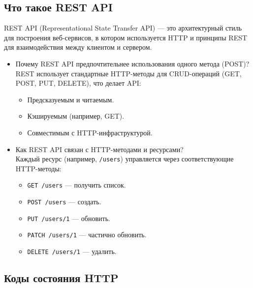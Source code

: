 \documentclass[a4paper,14pt]{article}
\begin{document}
\subsection{Что такое REST API}
REST API (Representational State Transfer API) — это архитектурный стиль для построения веб-сервисов, в котором используется HTTP и принципы REST для взаимодействия между клиентом и сервером.
\begin{itemize}
\item Почему REST API предпочтительнее использования одного метода (POST)? \\
REST использует стандартные HTTP-методы для CRUD-операций (GET, POST, PUT, DELETE), что делает API:
\begin{itemize}
  \item Предсказуемым и читаемым.
  \item Кэшируемым (например, GET).
  \item Совместимым с HTTP-инфраструктурой.
\end{itemize}

\item Как REST API связан с HTTP-методами и ресурсами? \\
Каждый ресурс (например, \texttt{/users}) управляется через соответствующие HTTP-методы:
\begin{itemize}
  \item \texttt{GET /users} — получить список.
  \item \texttt{POST /users} — создать.
  \item \texttt{PUT /users/1} — обновить.
  \item \texttt{PATCH /users/1} — частично обновить.
  \item \texttt{DELETE /users/1} — удалить.
\end{itemize}
\end{itemize}

\subsection{Коды состояния HTTP}
\end{document}
